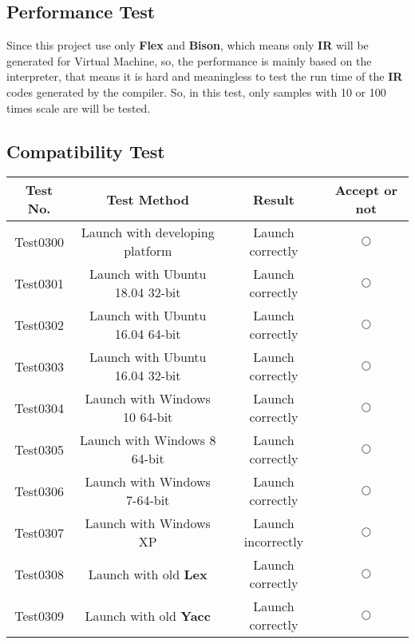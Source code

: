 \documentclass{article}
\begin{document}
		\subsection{Performance Test}
		Since this project use only \textbf{Flex} and \textbf{Bison}, which means only \textbf{IR} will be generated for Virtual Machine, so, the performance is mainly based on the interpreter, that means it is hard and meaningless to test the run time of the \textbf{IR} codes generated by the compiler. So, in this test, only samples with 10 or 100 times scale are will be tested.
		\subsection{Compatibility Test}
		\begin{center}
			\begin{tabular}{cccc}
			\toprule
			Test No. & Test Method & Result & Accept or not \\
			\midrule
			Test0300 & Launch with developing platform & Launch correctly & $ \bigcirc $\\
			Test0301 & Launch with Ubuntu 18.04 32-bit & Launch correctly & $ \bigcirc $\\
			Test0302 & Launch with Ubuntu 16.04 64-bit & Launch correctly & $ \bigcirc $\\
			Test0303 & Launch with Ubuntu 16.04 32-bit & Launch correctly & $ \bigcirc $\\
			Test0304 & Launch with Windows 10 64-bit & Launch correctly & $ \bigcirc $\\
			Test0305 & Launch with Windows 8 64-bit & Launch correctly & $ \bigcirc $\\
			Test0306 & Launch with Windows 7-64-bit & Launch correctly & $ \bigcirc $\\
			Test0307 & Launch with Windows XP & Launch incorrectly & $ \bigcirc $\\
			Test0308 & Launch with old \textbf{Lex} & Launch correctly & $ \bigcirc $\\
			Test0309 & Launch with old \textbf{Yacc} & Launch correctly & $ \bigcirc $\\
			\bottomrule
			\end{tabular}
			\end{center}
\end{document}
